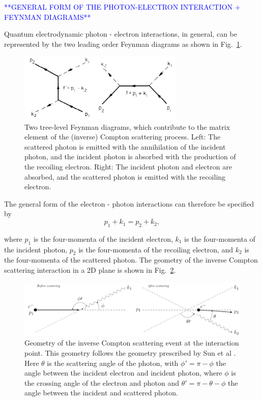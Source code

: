 \documentclass[../main.tex]{subfiles}
\begin{document}
\textcolor{blue}{**GENERAL FORM OF THE PHOTON-ELECTRON INTERACTION + FEYNMAN DIAGRAMS**}

Quantum electrodynamic photon - electron interactions, in general, can be represented by the two leading order Feynman diagrams as shown in Fig.~\ref{fig:ICS_Feynman_diagrams}. 

\begin{figure}[!h]
    \centering\includegraphics[width=0.7\textwidth]{Figures/Photon_Production_by_Inverse_Compton_Scattering/Berestetskii_ICS_Feynman.pdf}
    \caption{Two tree-level Feynman diagrams, which contribute to the matrix element of the (inverse) Compton scattering process. Left: The scattered photon is emitted with the annihilation of the incident photon, and the incident photon is absorbed with the production of the recoiling electron. Right: The incident photon and electron are absorbed, and the scattered photon is emitted with the recoiling electron. \cite{berestetskii1982quantum}}
    \label{fig:ICS_Feynman_diagrams}
\end{figure}

The general form of the electron - photon interactions can therefore be specified by
\begin{equation}
p_{1} + k_{1} = p_{2} + k_{2},
\label{eq:ICS_process}
\end{equation}

where $p_{1}$ is the four-momenta of the incident electron, $k_{1}$ is the four-momenta of the incident photon, $p_{2}$ is the four-momenta of the recoiling electron, and $k_{2}$ is the four-momenta of the scattered photon. The geometry of the inverse Compton scattering interaction in a 2D plane is shown in Fig.~\ref{fig:scattered_photon_kinematics}.

\begin{figure}[!h]
    \centering
    \includegraphics[width=\textwidth]{Figures/Photon_Production_by_Inverse_Compton_Scattering/scatteringkinematicsdiagram.pdf}
    \caption{Geometry of the inverse Compton scattering event at the interaction point. This geometry follows the geometry prescribed by Sun et al \cite{sun2009energy}. Here $\theta$ is the scattering angle of the photon, with $\phi' = \pi -\phi$ the angle between the incident electron and incident photon, where $\phi$ is the crossing angle of the electron and photon and $\theta' = \pi - \theta - \phi$ the angle between the incident and scattered photon. }
    \label{fig:scattered_photon_kinematics}
\end{figure}
\end{document}
